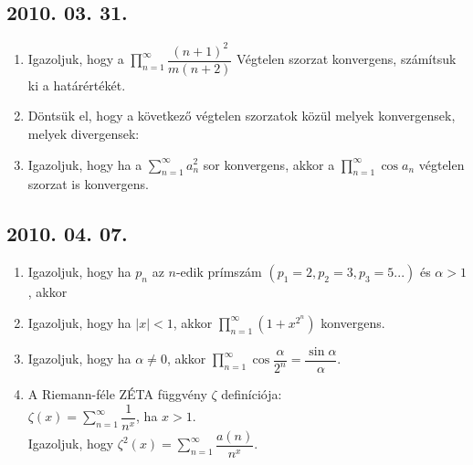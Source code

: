 \subsection*{2010. 03. 31.}
\begin{enumerate}
\item Igazoljuk, hogy a $\displaystyle\prod_{n=1}^{\infty} \dfrac{(n+1)^2}{m(n+2)}$ Végtelen szorzat konvergens, számítsuk ki a határértékét.
\item Döntsük el, hogy a következő végtelen szorzatok közül melyek konvergensek, melyek divergensek:
\item Igazoljuk, hogy ha a $\displaystyle\sum_{n=1}^{\infty} a_n^2$ sor konvergens, akkor a $\displaystyle\prod_{n=1}^{\infty}\cos a_n$ végtelen szorzat is konvergens.
\end{enumerate}

\subsection*{2010. 04. 07.}
\begin{enumerate}
\item Igazoljuk, hogy ha $p_n$ az $n$-edik prímszám $(p_1=2, p_2=3, p_3=5 ...)$ és $\alpha>1$, akkor
\item Igazoljuk, hogy ha $|x|<1$, akkor $\displaystyle\prod_{n=1}^{\infty} (1+x^{2^n})$ konvergens.
\item Igazoljuk, hogy ha $\alpha \not = 0$, akkor $\displaystyle\prod_{n=1}^{\infty}\cos\dfrac{\alpha}{2^n}=\dfrac{\sin \alpha}{\alpha}$.
\item A Riemann-féle ZÉTA függvény $\zeta$ definíciója: \\
$\zeta(x)=\displaystyle\sum_{n=1}^{\infty}\dfrac{1}{n^x}$, ha $x>1$.\\
Igazoljuk, hogy $\zeta^2(x)=\displaystyle\sum_{n=1}^{\infty}\dfrac{a(n)}{n^x}$.
\end{enumerate}

